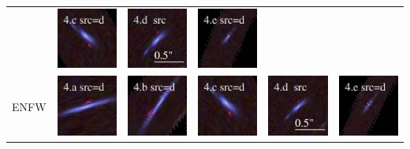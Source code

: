 \documentclass[useAMS,usenatbib]{mn2e}
\begin{document}
\begin{table}
\begin{tabular}{cccccc}
    & \multicolumn{1}{m{1.7cm}}{\includegraphics[height=2.00cm,clip]{figs/nsie_img/rgb.pre_4_c_d_tri.ps}}
    & \multicolumn{1}{m{1.7cm}}{\includegraphics[height=2.00cm,clip]{figs/nsie_img/rgb.src_4_d.ps}}
    & \multicolumn{1}{m{1.7cm}}{\includegraphics[height=2.00cm,clip]{figs/nsie_img/rgb.pre_4_e_d_tri.ps}} \\
    \multicolumn{1}{m{1cm}}{{\Large ENFW}}
    & \multicolumn{1}{m{1.7cm}}{\includegraphics[height=2.00cm,clip]{figs/enfw_img/rgb.pre_4_a_d_tri.ps}}
    & \multicolumn{1}{m{1.7cm}}{\includegraphics[height=2.00cm,clip]{figs/enfw_img/rgb.pre_4_b_d_tri.ps}}
    & \multicolumn{1}{m{1.7cm}}{\includegraphics[height=2.00cm,clip]{figs/enfw_img/rgb.pre_4_c_d_tri.ps}}
    & \multicolumn{1}{m{1.7cm}}{\includegraphics[height=2.00cm,clip]{figs/enfw_img/rgb.src_4_d.ps}}
    & \multicolumn{1}{m{1.7cm}}{\includegraphics[height=2.00cm,clip]{figs/enfw_img/rgb.pre_4_e_d_tri.ps}} \\
  \end{tabular}

\end{table}
\end{document}
